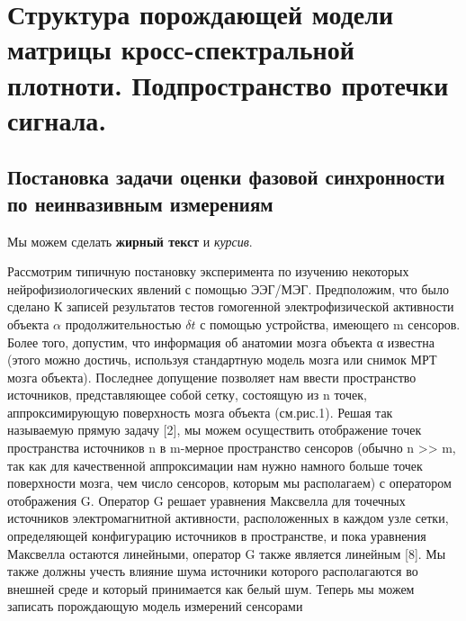 \chapter{Структура порождающей модели матрицы кросс-спектральной плотноти. 
         Подпространство протечки сигнала.} \label{chapt1}

\section{Постановка задачи оценки фазовой синхронности по неинвазивным измерениям} \label{sect1_1}

Мы можем сделать \textbf{жирный текст} и \textit{курсив}.

Рассмотрим типичную постановку эксперимента по изучению некоторых
нейрофизиологических явлений с помощью ЭЭГ/МЭГ.
Предположим, что было сделано К записей результатов тестов гомогенной электрофизической
активности объекта $\alpha$ продолжительностью $\delta t$ с помощью устройства, имеющего m сенсоров.
Более того, допустим, что информация об анатомии мозга объекта α известна (этого можно достичь,
используя стандартную модель мозга или снимок МРТ мозга объекта).
Последнее допущение позволяет нам ввести пространство источников, представляющее собой сетку,
состоящую из n точек, аппроксимирующую поверхность мозга объекта (см.рис.1).
Решая так называемую прямую задачу [2], мы можем осуществить отображение точек пространства
источников n в m-мерное пространство сенсоров
(обычно n >> m, так как для качественной аппроксимации нам нужно намного
больше точек поверхности мозга, чем число сенсоров, которым мы располагаем)
с оператором отображения G.
Оператор G решает уравнения Максвелла для точечных источников электромагнитной активности,
расположенных в каждом узле сетки, определяющей конфигурацию источников в пространстве,
и пока уравнения Максвелла остаются линейными, оператор G также является линейным [8].
Мы также должны учесть влияние шума источники которого располагаются во внешней среде
и который принимается как белый шум.
Теперь мы можем записать порождающую модель измерений сенсорами

